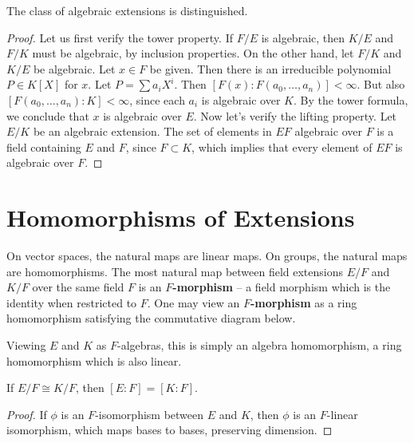 \begin{theorem}
    The class of algebraic extensions is distinguished.
\end{theorem}
\begin{proof}
    Let us first verify the tower property. If $F/E$ is algebraic, then $K/E$ and $F/K$ must be algebraic, by inclusion properties. On the other hand, let $F/K$ and $K/E$ be algebraic. Let $x \in F$ be given. Then there is an irreducible polynomial $P \in K[X]$ for $x$. Let $P = \sum a_i X^i$. Then $[F(x): F(a_0, \dots, a_n)] < \infty$. But also $[F(a_0, \dots, a_n): K] < \infty$, since each $a_i$ is algebraic over $K$. By the tower formula, we conclude that $x$ is algebraic over $E$. Now let's verify the lifting property. Let $E/K$ be an algebraic extension. The set of elements in $EF$ algebraic over $F$ is a field containing $E$ and $F$, since $F \subset K$, which implies that every element of $EF$ is algebraic over $F$.
\end{proof}

\section{Homomorphisms of Extensions}

On vector spaces, the natural maps are linear maps. On groups, the natural maps are homomorphisms. The most natural map between field extensions $E/F$ and $K/F$ over the same field $F$ is an {\bf $F$-morphism} -- a field morphism which is the identity when restricted to $F$. One may view an {\bf $F$-morphism} as a ring homomorphism satisfying the commutative diagram below.
%
\begin{center}
\end{center}
%
Viewing $E$ and $K$ as $F$-algebras, this is simply an algebra homomorphism, a ring homomorphism which is also linear.

\begin{lemma}
    If $E/F \cong K/F$, then $[E:F] = [K:F]$.
\end{lemma}
\begin{proof}
    If $\phi$ is an $F$-isomorphism between $E$ and $K$, then $\phi$ is an $F$-linear isomorphism, which maps bases to bases, preserving dimension.
\end{proof}

